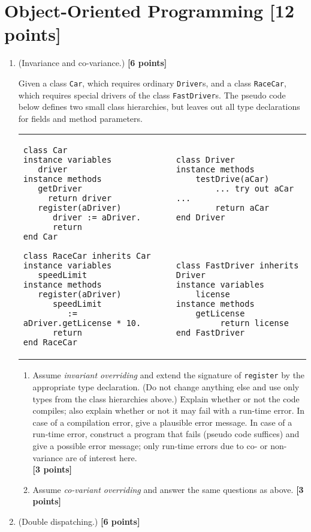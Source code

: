 \documentclass{article}
\begin{document}
\section{Object-Oriented Programming [12 points]}
\begin{enumerate}
\item (Invariance and co-variance.) \hfill{\textbf{[6 points]}}

Given a class \texttt{Car}, which requires ordinary \texttt{Driver}s,
and a class \texttt{RaceCar}, which requires special drivers
of the class \texttt{FastDriver}s.
The pseudo code below defines two small class hierarchies, but leaves
out all type declarations for fields and method parameters. 
%
\begin{center}
\small{
\begin{tabular}{ll}
\begin{minipage}{.5\textwidth}
\begin{verbatim}
class Car
instance variables
   driver
instance methods
   getDriver
     return driver
   register(aDriver)
      driver := aDriver.
      return
end Car

class RaceCar inherits Car
instance variables
   speedLimit
instance methods
   register(aDriver)
      speedLimit 
         := aDriver.getLicense * 10.
      return
end RaceCar
\end{verbatim}
\end{minipage}
& 
\begin{minipage}{.5\textwidth}
\begin{verbatim}
class Driver
instance methods
    testDrive(aCar) 
        ... try out aCar ...
        return aCar
end Driver




class FastDriver inherits Driver
instance variables
    license
instance methods
    getLicense
         return license
end FastDriver
\end{verbatim}
\end{minipage}
\end{tabular}
}
\end{center}
\begin{enumerate}
\item Assume \textit{invariant overriding} and extend the signature of \texttt{register}
by the appropriate type declaration. (Do not change anything else and use only types from the class hierarchies
above.) Explain 
whether or not the code compiles; also explain  whether or not it may fail with a
run-time error. In case of a compilation error, give a plausible error message.
In case of a run-time error, construct a program that fails (pseudo code
suffices) and give
a possible error message; only run-time errors due to co- or non-variance
are of interest here. 
\\
{\textbf{[3 points]}}
\item Assume \textit{co-variant overriding} and answer the same questions as above. 
{\textbf{[3 points]}}
\end{enumerate}
\newpage
\item (Double dispatching.) \hfill{\textbf{[6 points]}}


\end{enumerate}
\end{document}
